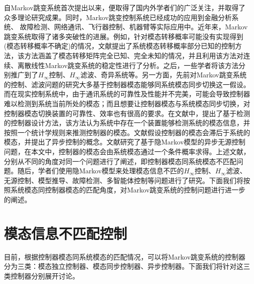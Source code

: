 	自Markov跳变系统首次提出以来\cite{florentin1961optimal}，便取得了国内外学者们的广泛关注，并取得了众多理论研究成果\cite{costa2006discrete,de2000output,xiong2005robust,ma2010stability,zhang2009hestimation,xu2007delay}。同时，Markov跳变控制系统已经成功的应用到金融分析系统\cite{mamon2007hidden}、 故障检测\cite{zhong2005faultdetection}、网络通讯\cite{network-communication-kim2004}、飞行器控制\cite{bar1993estimation,gray2000stability}、机器臂\cite{goncalves2004nonlinear}等实际应用中。近年来，Markov跳变系统取得了诸多突破性的进展。例如，针对模态转移概率可能没有实现得到(模态转移概率不确定)的情况，文献\cite{zhang2009stability}提出了系统模态转移概率部分已知的控制方法，该方法涵盖了模态转移矩阵完全已知、完全未知的情况，并且利用该方法对连续、离散线性Markov跳变系统的稳定性进行了分析。之后，一些学者将该方法分别推广到了$H_{\infty}$控制\cite{luan2012h}、$H_\infty$滤波\cite{ma2009robust}、奇异系统\cite{kao2014stabilization}等。另一方面，先前对Markov跳变系统的控制、滤波问题的研究大多基于控制器模态能够同系统模态同步切换这一假设。而在现实控制系统中，由于通讯系统的可靠性及性能并不完美，可能会导致控制器难以检测到系统当前所处的模态；而且想要让控制器模态与系统模态同步切换，对控制器模态切换装置的可靠性、效率也有很高的要求。在文献\cite{do2014detector}中，提出了基于检测的控制器设计方法，该方法认为系统中存在一个装置能够检测系统的模态信息，并按照一个统计学规则来推测控制器的模态。文献\cite{zhang2009stability}假设控制器的模态会滞后于系统的模态，并提出了异步控制的概念。文献\cite{wu2016passivity}研究了基于隐Markov模型的异步无源控制问题，在本文中，控制器的模态会由系统模态通过一个条件概率求得。上述文献，分别从不同的角度对同一个问题进行了阐述，即控制器模态同系统模态不匹配问题。随后，学者们使用隐Markov模型来处理模态信息不匹的$H_\infty$控制、$H_\infty$滤波、无源控制、模型推导、故障检测、多智能体控制等问题进行了研究。下面我们将按照系统模态同控制器模态的匹配角度，对Markov跳变系统的控制问题进行进一步的阐述。

\section{模态信息不匹配控制}
	目前，根据控制器模态同系统模态的匹配情况，可以将Markov跳变系统的控制器分为三类：模态独立控制器、模态同步控制器、异步控制器。下面我们将针对这三类控制器分别展开讨论。
